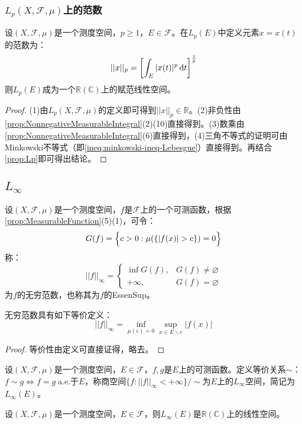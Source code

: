 \subsubsection{$L_p(X,\mathscr{F},\mu)$上的范数}
\begin{definition}
	设$(X,\mathscr{F},\mu)$是一个测度空间，$p\geqslant1$，$E\in\mathscr{F}$。在$L_p(E)$中定义元素$x=x(t)$的范数为：
	\begin{equation*}
		||x||_p=\left[\int_{E}|x(t)|^p\mathop{}\!\mathrm{d} t\right]^\frac{1}{p}
	\end{equation*}
	则$L_p(E)$成为一个$\mathbb{R}(\mathbb{C})$上的赋范线性空间。
\end{definition}
\begin{proof}
	(1)由$L_p(X,\mathscr{F},\mu)$的定义即可得到$||x||_p\in\mathbb{R}$。(2)非负性由\cref{prop:NonnegativeMeasurableIntegral}(2)(10)直接得到。(3)数乘由\cref{prop:NonnegativeMeasurableIntegral}(6)直接得到，(4)三角不等式的证明可由Minkowski不等式（即\cref{ineq:minkowski-ineq-Lebesgue}）直接得到。再结合\cref{prop:Lp}即可得出结论。
\end{proof}

\subsection{$L_{\infty}$}
\begin{definition}
	设$(X,\mathscr{F},\mu)$是一个测度空间，$f$是$\mathscr{F}$上的一个可测函数，根据\cref{prop:MeasurableFunction}(5)(1)，可令：
	\begin{equation*}
		G(f)=\Bigl\{c>0:\mu(\{|f(x)|>c\})=0\Bigr\}
	\end{equation*}
	称：
	\begin{equation*}
		||f||_{\infty}=
		\begin{cases}
			\inf G(f),&G(f)\ne\varnothing \\
			+\infty,&G(f)=\varnothing
		\end{cases}
	\end{equation*}
	为$f$的无穷范数，也称其为$f$的\gls{EssenSup}。
\end{definition}
\begin{theorem}
	无穷范数具有如下等价定义：
	\begin{equation*}
		||f||_\infty=\inf_{\mu(e)=0}\sup_{x\in E\backslash e}|f(x)|
	\end{equation*}
\end{theorem}
\begin{proof}
	等价性由定义可直接证得，略去。
\end{proof}
\begin{definition}
	设$(X,\mathscr{F},\mu)$是一个测度空间，$E\in\mathscr{F}$，$f,g$是$E$上的可测函数。定义等价关系$\sim$：$f\sim g\Leftrightarrow f=g\;$a.e.于$E$，称商空间$\{f:||f||_\infty<+\infty\}/\sim$为$E$上的$L_{\infty}$空间，简记为$L_{\infty}(E)$。
\end{definition}
\begin{property}\label{prop:Linfty}
	设$(X,\mathscr{F},\mu)$是一个测度空间，$E\in\mathscr{F}$，则$L_{\infty}(E)$是$\mathbb{R}(\mathbb{C})$上的线性空间。
\end{property}
